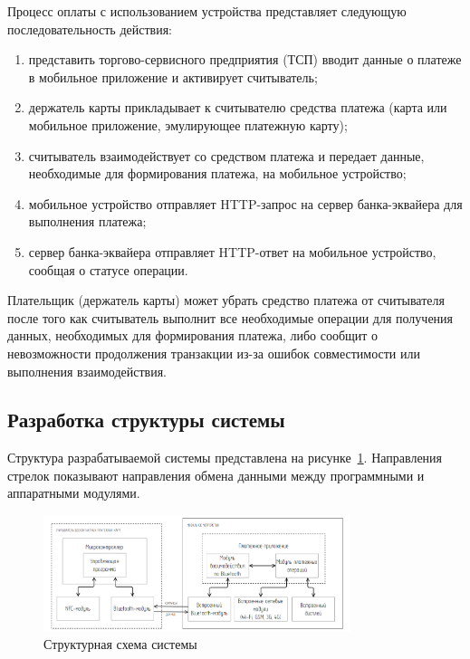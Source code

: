 Процесс оплаты с использованием устройства представляет следующую последовательность действия:
\begin{enumerate}
    \item представить торгово-сервисного предприятия (ТСП) вводит данные о платеже в мобильное приложение и активирует считыватель;
    \item держатель карты прикладывает к считывателю средства платежа (карта или мобильное приложение, эмулирующее платежную карту);
    \item считыватель взаимодействует со средством платежа и передает данные, необходимые для формирования платежа, на мобильное устройство;
    \item мобильное устройство отправляет HTTP-запрос на сервер банка-эквайера для выполнения платежа;
    \item сервер банка-эквайера отправляет HTTP-ответ на мобильное устройство, сообщая о статусе операции.
\end{enumerate}

Плательщик (держатель карты) может убрать средство платежа от считывателя после того как считыватель выполнит все необходимые операции для получения данных, необходимых для формирования платежа, либо сообщит о невозможности продолжения транзакции из-за ошибок совместимости или выполнения взаимодействия.


\subsection{Разработка структуры системы}

Структура разрабатываемой системы представлена на рисунке~\ref{fig:struct_scheme}.
Направления стрелок показывают направления обмена данными между программными и аппаратными модулями.

\begin{figure}[H]
    \centering
    \includegraphics[width=0.8\textwidth]{images/design/struct_scheme}
    \caption{\centering Структурная схема системы}
    \label{fig:struct_scheme}
\end{figure}

